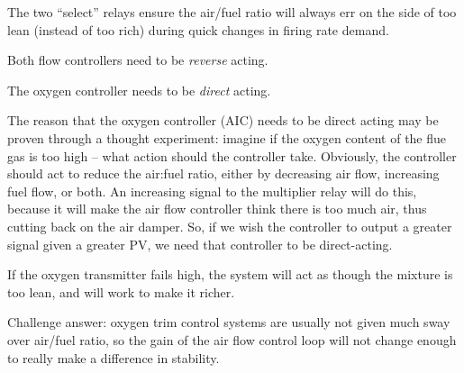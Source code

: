 





The two ``select'' relays ensure the air/fuel ratio will always err on the side of too lean (instead of too rich) during quick changes in firing rate demand.  

\vskip 10pt

Both flow controllers need to be {\it reverse} acting.

\vskip 10pt

The oxygen controller needs to be {\it direct} acting.







The reason that the oxygen controller (AIC) needs to be direct acting may be proven through a thought experiment: imagine if the oxygen content of the flue gas is too high -- what action should the controller take.  Obviously, the controller should act to reduce the air:fuel ratio, either by decreasing air flow, increasing fuel flow, or both.  An increasing signal to the multiplier relay will do this, because it will make the air flow controller think there is too much air, thus cutting back on the air damper.  So, if we wish the controller to output a greater signal given a greater PV, we need that controller to be direct-acting.

\vskip 10pt

If the oxygen transmitter fails high, the system will act as though the mixture is too lean, and will work to make it richer.

\vskip 10pt

Challenge answer: oxygen trim control systems are usually not given much sway over air/fuel ratio, so the gain of the air flow control loop will not change enough to really make a difference in stability.




